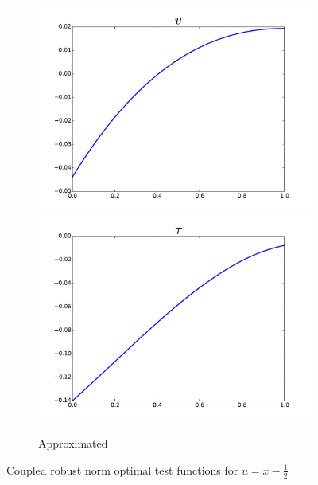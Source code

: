 \documentclass{article}
\begin{document}
\begin{figure}[ht]
\begin{subfigure}[t]{0.4\textwidth}
\includegraphics[width=\textwidth]{OptimalTestFunctions/RobustApprox3_v}\\
\includegraphics[width=\textwidth]{OptimalTestFunctions/RobustApprox3_tau}\\
\caption{Approximated}
\label{fig:approxRobust}
\end{subfigure}
\caption{Coupled robust norm optimal test functions for $u=x-\frac{1}{2}$}
\label{fig:optimalRobust}
\end{figure}

 

\end{document}
